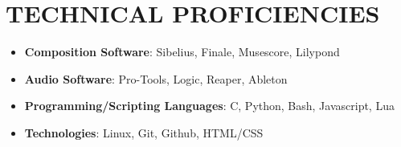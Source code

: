\documentclass{article}
\newcommand{\resumeSubHeadingListStart}{\begin{itemize}[leftmargin=0pt]}
\newcommand{\resumeSubHeadingListEnd}{\end{itemize}}
\begin{document}
    \section{TECHNICAL PROFICIENCIES}
        \resumeSubHeadingListStart
            \item[]
                \textbf{Composition Software}{: Sibelius, Finale, Musescore, Lilypond}
            \item[]
                \textbf{Audio Software}{: Pro-Tools, Logic, Reaper, Ableton}
            \item[]
                \textbf{Programming/Scripting Languages}{: C, Python, Bash, Javascript, Lua}
            \item[]
                \textbf{Technologies}{: Linux, Git, Github, HTML/CSS}
        \resumeSubHeadingListEnd
\end{document}
